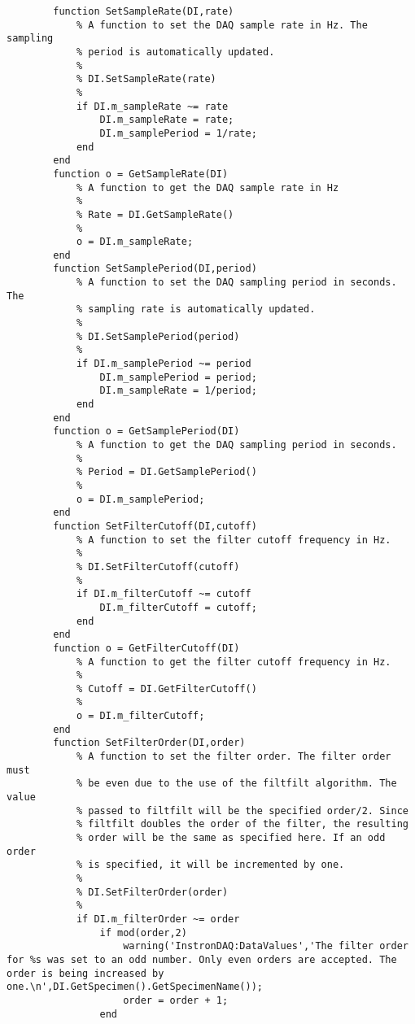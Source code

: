 \begin{lstlisting}
        function SetSampleRate(DI,rate)
            % A function to set the DAQ sample rate in Hz. The sampling
            % period is automatically updated.
            %
            % DI.SetSampleRate(rate)
            %
            if DI.m_sampleRate ~= rate
                DI.m_sampleRate = rate;
                DI.m_samplePeriod = 1/rate;
            end
        end
        function o = GetSampleRate(DI)
            % A function to get the DAQ sample rate in Hz
            %
            % Rate = DI.GetSampleRate()
            %
            o = DI.m_sampleRate;
        end
        function SetSamplePeriod(DI,period)
            % A function to set the DAQ sampling period in seconds. The
            % sampling rate is automatically updated.
            %
            % DI.SetSamplePeriod(period)
            %
            if DI.m_samplePeriod ~= period
                DI.m_samplePeriod = period;
                DI.m_sampleRate = 1/period;
            end
        end
        function o = GetSamplePeriod(DI)
            % A function to get the DAQ sampling period in seconds.
            %
            % Period = DI.GetSamplePeriod()
            %
            o = DI.m_samplePeriod;
        end
        function SetFilterCutoff(DI,cutoff)
            % A function to set the filter cutoff frequency in Hz.
            %
            % DI.SetFilterCutoff(cutoff)
            %
            if DI.m_filterCutoff ~= cutoff
                DI.m_filterCutoff = cutoff;
            end
        end
        function o = GetFilterCutoff(DI)
            % A function to get the filter cutoff frequency in Hz.
            %
            % Cutoff = DI.GetFilterCutoff()
            %
            o = DI.m_filterCutoff;
        end
        function SetFilterOrder(DI,order)
            % A function to set the filter order. The filter order must
            % be even due to the use of the filtfilt algorithm. The value
            % passed to filtfilt will be the specified order/2. Since
            % filtfilt doubles the order of the filter, the resulting
            % order will be the same as specified here. If an odd order
            % is specified, it will be incremented by one.
            %
            % DI.SetFilterOrder(order)
            %
            if DI.m_filterOrder ~= order
                if mod(order,2)
                    warning('InstronDAQ:DataValues','The filter order for %s was set to an odd number. Only even orders are accepted. The order is being increased by one.\n',DI.GetSpecimen().GetSpecimenName());
                    order = order + 1;
                end

\end{lstlisting}
